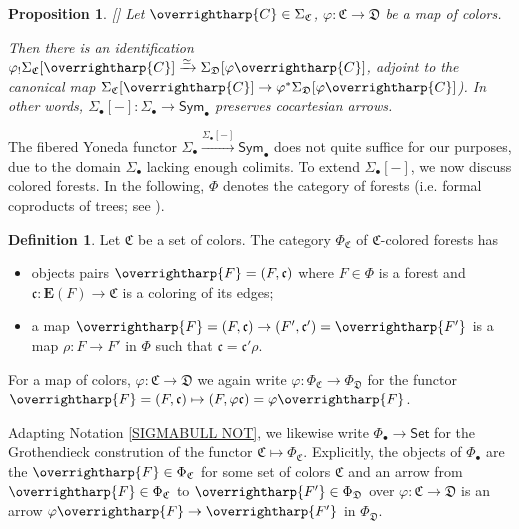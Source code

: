 \documentclass[a4paper,10pt
,draft
]{article}%
\numberwithin{equation}{section}
\numberwithin{figure}{section}
\newtheorem{proposition}[equation]{Proposition}%
\theoremstyle{definition} %
\newtheorem{definition}[equation]{Definition}%
\newcommand{\vect}[1]{\text{\overrightharp{\ensuremath{#1}}}}
\newcommand{\1}{\ensuremath{\mathbbm 1}}%
\begin{document}
\begin{proposition}\label{FIBYONPUSH PROP}
	[{\cite[Prop. \ref{OC-FIBYONPUSH PROP}]{BP_FCOP}}]
Let $\vect{C} \in \Sigma_{\mathfrak{C}}$,
$\varphi \colon \mathfrak{C} \to \mathfrak{D}$
be a map of colors.

Then there is an identification
$\varphi_{!} \Sigma_{\mathfrak{C}}[\vect{C}]
\xrightarrow{\simeq}
\Sigma_{\mathfrak{D}}[\varphi\vect{C}]$,
adjoint to the canonical map
$\Sigma_{\mathfrak{C}}[\vect{C}]
\to
\varphi^{\**}\Sigma_{\mathfrak{D}}[\varphi\vect{C}]$).
%
In other words,
$\Sigma_{\bullet}[-] \colon 
\Sigma_{\bullet} \to \mathsf{Sym}_{\bullet}$
preserves cocartesian arrows.
\end{proposition}


The fibered Yoneda functor
$
\Sigma_{\bullet} \xrightarrow{\Sigma_{\bullet}[-]} \mathsf{Sym}_{\bullet}
$
does not quite suffice for our purposes, 
due to the domain $\Sigma_{\bullet}$
lacking enough colimits.
To extend $\Sigma_{\bullet}[-]$,
we now discuss colored forests.
In the following, $\Phi$ denotes the category of forests
(i.e. formal coproducts of trees; see \cite[\S 5.1]{Per18}).



\begin{definition}\label{COLFOR DEF}
Let $\mathfrak{C}$ be a set of colors.
The category $\Phi_{\mathfrak{C}}$ of $\mathfrak{C}$-colored forests has
\begin{itemize}
\item objects pairs
$\vect{F} = (F,\mathfrak{c})$
where 
$F\in \Phi$ is a forest
and 
$\mathfrak{c}\colon \boldsymbol{E}(F) \to \mathfrak{C}$ 
is a coloring of its edges;
\item a map
$\vect{F}=(F,\mathfrak{c}) \to 
(F',\mathfrak{c}') = \vect{F'}$
is a map $\rho \colon F \to F'$ in $\Phi$
such that
$\mathfrak{c} = \mathfrak{c}' \rho$.
\end{itemize}
For a map of colors,
$\varphi\colon \mathfrak{C} \to \mathfrak{D}$
we again write
$\varphi \colon \Phi_{\mathfrak{C}} \to \Phi_{\mathfrak{D}}$
for the functor  
$\vect{F} = (F,\mathfrak{c})
\mapsto (F,\varphi\mathfrak{c}) = \varphi\vect{F}$.

Adapting Notation \ref{SIGMABULL NOT},
we likewise write
$\Phi_{\bullet} \to \mathsf{Set}$
for the Grothendieck constrution of the functor 
$\mathfrak{C} \mapsto \Phi_{\mathfrak{C}}$.
Explicitly, 
the objects of $\Phi_{\bullet}$
are the $\vect{F} \in \Phi_{\mathfrak{C}}$ 
for some set of colors $\mathfrak{C}$
and an arrow from
$\vect{F} \in \Phi_{\mathfrak{C}}$ to
$\vect{F'} \in \Phi_{\mathfrak{D}}$
over $\varphi \colon \mathfrak{C} \to \mathfrak{D}$
is an arrow
$\varphi \vect{F} \to \vect{F'}$ in $\Phi_{\mathfrak{D}}$.
\end{definition}
\end{document}
